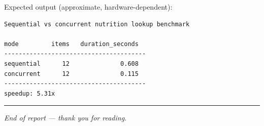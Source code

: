 \documentclass[11pt,a4paper]{article}
\begin{document}
Expected output (approximate, hardware-dependent):
\begin{lstlisting}[numbers=none,basicstyle=\ttfamily\small,backgroundcolor=\color{backcolour}]
Sequential vs concurrent nutrition lookup benchmark

mode         items   duration_seconds
---------------------------------------
sequential      12              0.608
concurrent      12              0.115
---------------------------------------
speedup: 5.31x
\end{lstlisting}

\vspace{1em}\hrule\vspace{0.6em}
\noindent\small\textit{End of report --- thank you for reading.}
\end{document}
